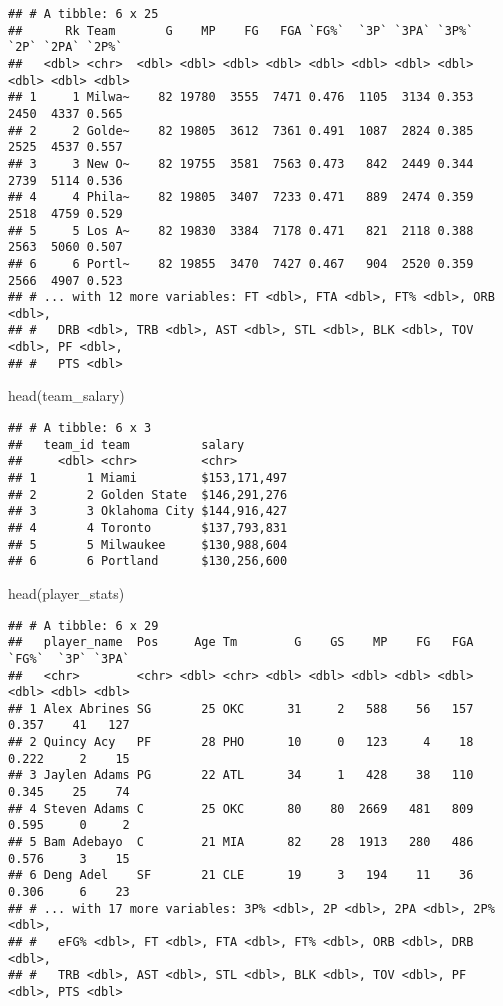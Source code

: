 \documentclass[
]{article}
\newenvironment{Shaded}{\begin{snugshade}}{\end{snugshade}}
\newcommand{\FunctionTok}[1]{\textcolor[rgb]{0.00,0.00,0.00}{#1}}
\newcommand{\NormalTok}[1]{#1}
\begin{document}
\begin{verbatim}
## # A tibble: 6 x 25
##      Rk Team       G    MP    FG   FGA `FG%`  `3P` `3PA` `3P%`  `2P` `2PA` `2P%`
##   <dbl> <chr>  <dbl> <dbl> <dbl> <dbl> <dbl> <dbl> <dbl> <dbl> <dbl> <dbl> <dbl>
## 1     1 Milwa~    82 19780  3555  7471 0.476  1105  3134 0.353  2450  4337 0.565
## 2     2 Golde~    82 19805  3612  7361 0.491  1087  2824 0.385  2525  4537 0.557
## 3     3 New O~    82 19755  3581  7563 0.473   842  2449 0.344  2739  5114 0.536
## 4     4 Phila~    82 19805  3407  7233 0.471   889  2474 0.359  2518  4759 0.529
## 5     5 Los A~    82 19830  3384  7178 0.471   821  2118 0.388  2563  5060 0.507
## 6     6 Portl~    82 19855  3470  7427 0.467   904  2520 0.359  2566  4907 0.523
## # ... with 12 more variables: FT <dbl>, FTA <dbl>, FT% <dbl>, ORB <dbl>,
## #   DRB <dbl>, TRB <dbl>, AST <dbl>, STL <dbl>, BLK <dbl>, TOV <dbl>, PF <dbl>,
## #   PTS <dbl>
\end{verbatim}

\begin{Shaded}
\begin{Highlighting}[]
\FunctionTok{head}\NormalTok{(team\_salary)}
\end{Highlighting}
\end{Shaded}

\begin{verbatim}
## # A tibble: 6 x 3
##   team_id team          salary      
##     <dbl> <chr>         <chr>       
## 1       1 Miami         $153,171,497
## 2       2 Golden State  $146,291,276
## 3       3 Oklahoma City $144,916,427
## 4       4 Toronto       $137,793,831
## 5       5 Milwaukee     $130,988,604
## 6       6 Portland      $130,256,600
\end{verbatim}

\begin{Shaded}
\begin{Highlighting}[]
\FunctionTok{head}\NormalTok{(player\_stats)}
\end{Highlighting}
\end{Shaded}

\begin{verbatim}
## # A tibble: 6 x 29
##   player_name  Pos     Age Tm        G    GS    MP    FG   FGA `FG%`  `3P` `3PA`
##   <chr>        <chr> <dbl> <chr> <dbl> <dbl> <dbl> <dbl> <dbl> <dbl> <dbl> <dbl>
## 1 Alex Abrines SG       25 OKC      31     2   588    56   157 0.357    41   127
## 2 Quincy Acy   PF       28 PHO      10     0   123     4    18 0.222     2    15
## 3 Jaylen Adams PG       22 ATL      34     1   428    38   110 0.345    25    74
## 4 Steven Adams C        25 OKC      80    80  2669   481   809 0.595     0     2
## 5 Bam Adebayo  C        21 MIA      82    28  1913   280   486 0.576     3    15
## 6 Deng Adel    SF       21 CLE      19     3   194    11    36 0.306     6    23
## # ... with 17 more variables: 3P% <dbl>, 2P <dbl>, 2PA <dbl>, 2P% <dbl>,
## #   eFG% <dbl>, FT <dbl>, FTA <dbl>, FT% <dbl>, ORB <dbl>, DRB <dbl>,
## #   TRB <dbl>, AST <dbl>, STL <dbl>, BLK <dbl>, TOV <dbl>, PF <dbl>, PTS <dbl>
\end{verbatim}
\end{document}
